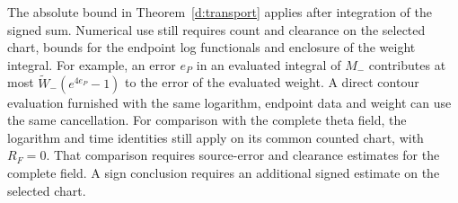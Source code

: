 The absolute bound in Theorem~\ref{d:transport} applies after
integration of the signed sum. Numerical use still requires count
and clearance on the selected chart, bounds for the endpoint log
functionals and enclosure of the weight integral. For example, an
error \(e_P\) in an evaluated integral of \(M_-\) contributes at
most \(\widetilde W_-(e^{4e_P}-1)\) to the error of the evaluated
weight. A direct contour evaluation furnished with the same
logarithm, endpoint data and weight can use the same cancellation.
For comparison with the complete theta field, the logarithm and time
identities still apply on its common counted chart, with \(R_F=0\).
That comparison requires source-error and clearance estimates for
the complete field. A sign conclusion requires an additional signed
estimate on the selected chart.
